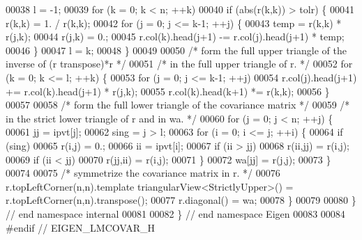 \begin{DoxyCode}
00038     l = -1;
00039     \textcolor{keywordflow}{for} (k = 0; k < n; ++k)
00040         \textcolor{keywordflow}{if} (abs(r(k,k)) > tolr) \{
00041             r(k,k) = 1. / r(k,k);
00042             \textcolor{keywordflow}{for} (j = 0; j <= k-1; ++j) \{
00043                 temp = r(k,k) * r(j,k);
00044                 r(j,k) = 0.;
00045                 r.col(k).head(j+1) -= r.col(j).head(j+1) * temp;
00046             \}
00047             l = k;
00048         \}
00049 
00050     \textcolor{comment}{/* form the full upper triangle of the inverse of (r transpose)*r */}
00051     \textcolor{comment}{/* in the full upper triangle of r. */}
00052     \textcolor{keywordflow}{for} (k = 0; k <= l; ++k) \{
00053         \textcolor{keywordflow}{for} (j = 0; j <= k-1; ++j)
00054             r.col(j).head(j+1) += r.col(k).head(j+1) * r(j,k);
00055         r.col(k).head(k+1) *= r(k,k);
00056     \}
00057 
00058     \textcolor{comment}{/* form the full lower triangle of the covariance matrix */}
00059     \textcolor{comment}{/* in the strict lower triangle of r and in wa. */}
00060     \textcolor{keywordflow}{for} (j = 0; j < n; ++j) \{
00061         jj = ipvt[j];
00062         sing = j > l;
00063         \textcolor{keywordflow}{for} (i = 0; i <= j; ++i) \{
00064             \textcolor{keywordflow}{if} (sing)
00065                 r(i,j) = 0.;
00066             ii = ipvt[i];
00067             \textcolor{keywordflow}{if} (ii > jj)
00068                 r(ii,jj) = r(i,j);
00069             \textcolor{keywordflow}{if} (ii < jj)
00070                 r(jj,ii) = r(i,j);
00071         \}
00072         wa[jj] = r(j,j);
00073     \}
00074 
00075     \textcolor{comment}{/* symmetrize the covariance matrix in r. */}
00076     r.topLeftCorner(n,n).template triangularView<StrictlyUpper>() = r.topLeftCorner(n,n).transpose();
00077     r.diagonal() = wa;
00078 \}
00079 
00080 \} \textcolor{comment}{// end namespace internal}
00081 
00082 \} \textcolor{comment}{// end namespace Eigen}
00083 
00084 \textcolor{preprocessor}{#endif // EIGEN\_LMCOVAR\_H}
\end{DoxyCode}
